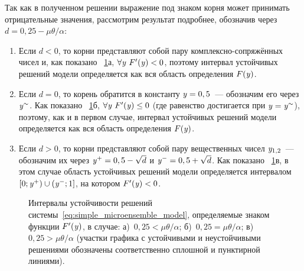 Так как в полученном решении выражение под знаком корня может принимать отрицательные значения, рассмотрим результат подробнее, обозначив через $d = 0,25 - \mu \theta / \alpha$:
\begin{enumerate}[wide]
    \item Если $d < 0$, то корни представляют собой пару комплексно-сопряжённых чисел и, как показано \onfigure~\ref{fig:analysis_sigm_stability}а, $\forall\mathit{y}\ F^{\prime}(\mathit{y}) < 0$, поэтому интервал устойчивых решений модели определяется как вся область определения $F(\mathit{y})$.
    \item Если $d = 0$, то корень обратится в константу $\mathit{y} = 0,5$~--- обозначим его через $\mathit{y}^{\sim}$. Как показано \onfigure~\ref{fig:analysis_sigm_stability}б, $\forall\mathit{y}\ F^{\prime}(\mathit{y}) \le 0$ (где равенство достигается при $\mathit{y} = \mathit{y}^{\sim}$), поэтому, как и в первом случае, интервал устойчивых решений модели определяется как вся область определения $F(\mathit{y})$.
    \item Если $d > 0$, то корни представляют собой пару вещественных чисел $\mathit{y}_{1,2}$~--- обозначим их через $\mathit{y}^{+} = 0,5 - \sqrt{d}$ и $\mathit{y}^{-} = 0,5 + \sqrt{d}$. Как показано \onfigure~\ref{fig:analysis_sigm_stability}в, в этом случае область устойчивых решений модели определяется интервалом $\left[0; \mathit{y}^{+}\right) \cup \left(\mathit{y}^{-}; 1\right]$, на котором $F^{\prime}(\mathit{y}) < 0$.
\end{enumerate}

\begin{figure}[ht]
    \begin{minipage}{\textwidth}
        \caption{Интервалы устойчивости решений системы~\eqref{eq:simple_microensemble_model}, определяемые знаком функции $F^{\prime}(\mathit{y})$, в случае: а)~$0,25 < \mu \theta / \alpha$; б)~$0,25 = \mu \theta / \alpha$; в)~$0,25 > \mu \theta / \alpha$ (участки графика с устойчивыми и неустойчивыми решениями обозначены соответственно сплошной и пунктирной линиями).}
        \label{fig:analysis_sigm_stability}
    \end{minipage}
\end{figure}

